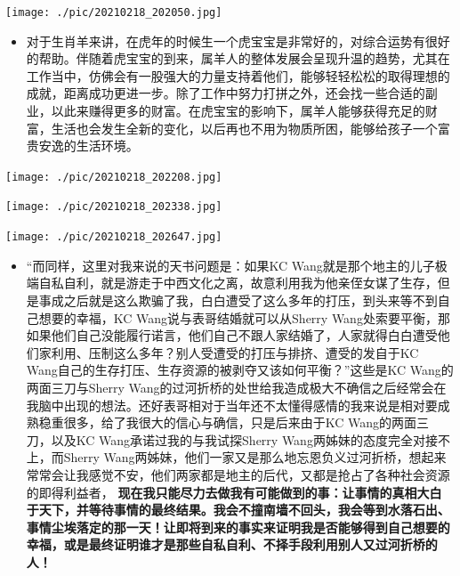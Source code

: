 \documentclass[9pt, b5paper]{article}
\begin{document}
\begin{itemize}
\begin{itemize}
\begin{center}
\texttt{[image: ./pic/20210218\_202050.jpg]}
\end{center}
\begin{itemize}
\item 对于生肖羊来讲，在虎年的时候生一个虎宝宝是非常好的，对综合运势有很好的帮助。伴随着虎宝宝的到来，属羊人的整体发展会呈现升温的趋势，尤其在工作当中，仿佛会有一股强大的力量支持着他们，能够轻轻松松的取得理想的成就，距离成功更进一步。除了工作中努力打拼之外，还会找一些合适的副业，以此来赚得更多的财富。在虎宝宝的影响下，属羊人能够获得充足的财富，生活也会发生全新的变化，以后再也不用为物质所困，能够给孩子一个富贵安逸的生活环境。
\end{itemize}

\begin{center}
\texttt{[image: ./pic/20210218\_202208.jpg]}
\end{center}

\begin{center}
\texttt{[image: ./pic/20210218\_202338.jpg]}
\end{center}

\begin{center}
\texttt{[image: ./pic/20210218\_202647.jpg]}
\end{center}

\begin{itemize}
\item “而同样，这里对我来说的天书问题是：如果KC Wang就是那个地主的儿子极端自私自利，就是游走于中西文化之离，故意利用我为他亲侄女谋了生存，但是事成之后就是这么欺骗了我，白白遭受了这么多年的打压，到头来等不到自己想要的幸福，KC Wang说与表哥结婚就可以从Sherry Wang处索要平衡，那如果他们自己没能履行诺言，他们自己不跟人家结婚了，人家就得白白遭受他们家利用、压制这么多年？别人受遭受的打压与排挤、遭受的发自于KC Wang自己的生存打压、生存资源的被剥夺又该如何平衡？”这些是KC Wang的两面三刀与Sherry Wang的过河折桥的处世给我造成极大不确信之后经常会在我脑中出现的想法。还好表哥相对于当年还不太懂得感情的我来说是相对要成熟稳重很多，给了我很大的信心与确信，只是后来由于KC Wang的两面三刀，以及KC Wang承诺过我的与我试探Sherry Wang两姊妹的态度完全对接不上，而Sherry Wang两姊妹，他们一家又是那么地忘恩负义过河折桥，想起来常常会让我感觉不安，他们两家都是地主的后代，又都是抢占了各种社会资源的即得利益者， \textbf{现在我只能尽力去做我有可能做到的事：让事情的真相大白于天下，并等待事情的最终结果。我会不撞南墙不回头，我会等到水落石出、事情尘埃落定的那一天！让即将到来的事实来证明我是否能够得到自己想要的幸福，或是最终证明谁才是那些自私自利、不择手段利用别人又过河折桥的人！}
\end{itemize}
\end{itemize}


\end{itemize}
\end{document}
